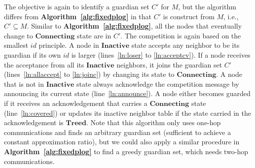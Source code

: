 \documentclass[10pt, conference, compsocconf]{IEEEtran}
\begin{document}
    The objective is again to identify a guardian set $C'$ for $M$, but the algorithm differs from \textbf{Algorithm~\ref{alg:fixedplog}} in that $C'$ is construct from $M$, i.e., $C' \subseteq M$. Similar to \textbf{Algorithm~\ref{alg:fixedplog}}, all the nodes that eventually change to $\mathbf{Connecting}$ state are in $C'$. The competition is again based on the smallest $\mathit{id}$ principle. A node in $\mathbf{Inactive}$ state accepts any neighbor to be its guardian if its own $\mathit{id}$ is larger (lines~\ref{ln:loser} to \ref{ln:acceptcv}). If a node receives the acceptance from all its $\mathbf{Inactive}$ neighbors, it joins the guardian set $C'$ (lines~\ref{ln:allaccept} to \ref{ln:joinc}) by changing its state to $\mathbf{Connecting}$. A node that is not in $\mathbf{Inactive}$ state always acknowledge the competition message by announcing its current state (line~\ref{ln:announce}). A node either becomes guarded if it receives an acknowledgement that carries a $\mathbf{Connecting}$ state (line~\ref{ln:covered}) or updates its inactive neighbor table if the state carried in the acknowledgement is $\mathbf{Treed}$. Note that this algorithm only uses one-hop communications and finds an arbitrary guardian set (sufficient to achieve a constant approximation ratio), but we could also apply a similar procedure in \textbf{Algorithm~\ref{alg:fixedplog}} to find a greedy guardian set, which needs two-hop communications.
\end{document}
